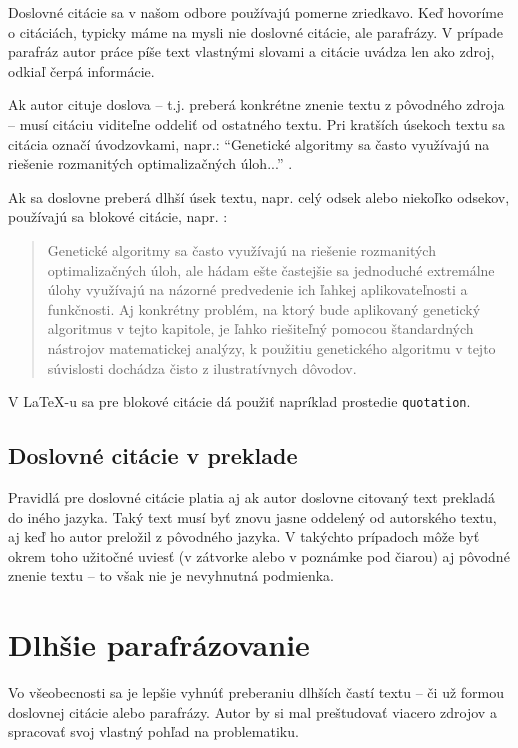 Doslovné citácie sa v našom odbore používajú pomerne zriedkavo. Keď hovoríme o citáciách, typicky máme na mysli nie doslovné citácie, ale parafrázy. V prípade parafráz autor práce píše text vlastnými slovami a citácie uvádza len ako zdroj, odkiaľ čerpá informácie.

Ak autor cituje doslova -- t.j. preberá konkrétne znenie textu z pôvodného zdroja -- musí citáciu viditeľne oddeliť od ostatného textu. Pri kratších úsekoch textu sa citácia označí úvodzovkami, napr.: \enquote{Genetické algoritmy sa často využívajú na riešenie rozmanitých optimalizačných úloh...} \cite{Hynek2008}.

Ak sa doslovne preberá dlhší úsek textu, napr. celý odsek alebo niekoľko odsekov, používajú sa blokové citácie, napr. \cite{Hynek2008}:
\begin{quotation}
Genetické algoritmy sa často využívajú na riešenie rozmanitých optimalizačných úloh, ale hádam ešte častejšie sa jednoduché extremálne úlohy využívajú na názorné predvedenie ich ľahkej aplikovateľnosti a funkčnosti. Aj konkrétny problém, na ktorý bude aplikovaný genetický algoritmus v tejto kapitole, je ľahko riešiteľný pomocou štandardných nástrojov matematickej analýzy, k použitiu genetického algoritmu v tejto súvislosti dochádza čisto z ilustratívnych dôvodov.
\end{quotation}
V LaTeX-u sa pre blokové citácie dá použiť napríklad prostedie \texttt{quotation}.

\subsection{Doslovné citácie v preklade}

Pravidlá pre doslovné citácie platia aj ak autor doslovne citovaný text prekladá do iného jazyka. Taký text musí byť znovu jasne oddelený od autorského textu, aj keď ho autor preložil z pôvodného jazyka. V takýchto prípadoch môže byť okrem toho užitočné uviesť (v zátvorke alebo v poznámke pod čiarou) aj pôvodné znenie textu -- to však nie je nevyhnutná podmienka.

\section{Dlhšie parafrázovanie}

Vo všeobecnosti sa je lepšie vyhnúť preberaniu dlhších častí textu -- či už formou doslovnej citácie alebo parafrázy. Autor by si mal preštudovať viacero zdrojov a spracovať svoj vlastný pohľad na problematiku.

